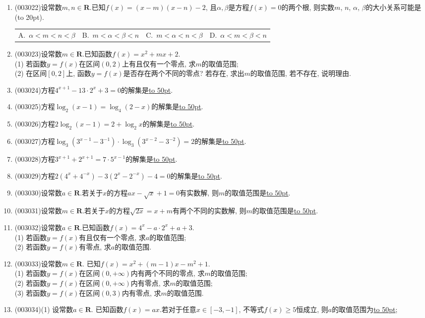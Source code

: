 \documentclass[10pt,a4paper]{article}
\newcommand{\blank}[1]{\underline{\hbox to #1pt{}}}
\newcommand{\bracket}[1]{(\hbox to #1pt{})}
\newcommand{\fourch}[4]{\par\begin{tabular}{p{.23\textwidth}p{.23\textwidth}p{.23\textwidth}p{.23\textwidth}}
A.~#1 &B.~#2& C.~#3& D.~#4
\end{tabular}}
\begin{document}
\begin{enumerate}[1.]
\item {\tiny (003022)}设常数$m,n\in \mathbf{R}$.已知$f(x)=(x-m)(x-n)-2$, 且$\alpha ,\beta$是方程$f(x)=0$的两个根, 则实数$m$, $n$, $\alpha$, $\beta$的大小关系可能是\bracket{20}.
\fourch{$\alpha<m<n<\beta$}{$m<\alpha<\beta<n$}{$m<\alpha<n<\beta$}{$\alpha<m<\beta<n$	}
\item {\tiny (003023)}设常数$m\in \mathbf{R}$.已知函数$f(x)=x^2+mx+2$.\\
(1) 若函数$y=f(x)$在区间$(0, 2)$上有且仅有一个零点, 求$m$的取值范围;\\
(2) 在区间$[0,2]$上, 函数$y=f(x)$是否存在两个不同的零点? 若存在, 求出$m$的取值范围, 若不存在, 说明理由.
\item {\tiny (003024)}方程$4^{x+1}-13\cdot 2^x+3=0$的解集是\blank{50}.
\item {\tiny (003025)}方程$\log_2(x-1)=\log_4(2-x)$的解集是\blank{50}.
\item {\tiny (003026)}方程$2\log_2(x-1)=2+\log_2 x$的解集是\blank{50}.
\item {\tiny (003027)}方程$\log_3(3^{x-1}-3^{-1})\cdot \log_3(3^{x-2}-3^{-2})=2$的解集是\blank{50}.
\item {\tiny (003028)}方程$3^{x+1}+2^{x+1}=7\cdot 5^{x-1}$的解集是\blank{50}.
\item {\tiny (003029)}方程$2(4^x+4^{-x})-3(2^x-2^{-x})-4=0$的解集是\blank{50}.
\item {\tiny (003030)}设常数$a\in \mathbf{R}$.若关于$x$的方程$ax-\sqrt x+1=0$有实数解, 则$m$的取值范围是\blank{50}.
\item {\tiny (003031)}设常数$m\in \mathbf{R}$.若关于$x$的方程$\sqrt{2x}=x+m$有两个不同的实数解, 则$m$的取值范围是\blank{50}.
\item {\tiny (003032)}设常数$a\in \mathbf{R}$.已知函数$f(x)=4^x-a\cdot 2^x+a+3$.\\
(1) 若函数$y=f(x)$有且仅有一个零点, 求$a$的取值范围;\\
(2) 若函数$y=f(x)$有零点, 求$a$的取值范围.
\item {\tiny (003033)}设常数$m\in \mathbf{R}$. 已知$f(x)=x^2+(m-1)x-m^2+1$.\\
(1) 若函数$y=f(x)$在区间$(0,+\infty)$内有两个不同的零点, 求$m$的取值范围;\\
(2) 若函数$y=f(x)$在区间$(0,+\infty)$内有零点, 求$m$的取值范围;\\
(3) 若函数$y=f(x)$在区间$(0,3)$内有零点, 求$m$的取值范围.
\item {\tiny (003034)}(1) 设常数$a\in \mathbf{R}$. 已知函数$f(x)=ax$.若对于任意$x\in [-3,-1]$, 不等式$f(x)\ge 5$恒成立, 则$a$的取值范围为\blank{50};\\

\end{enumerate}
\end{document}
